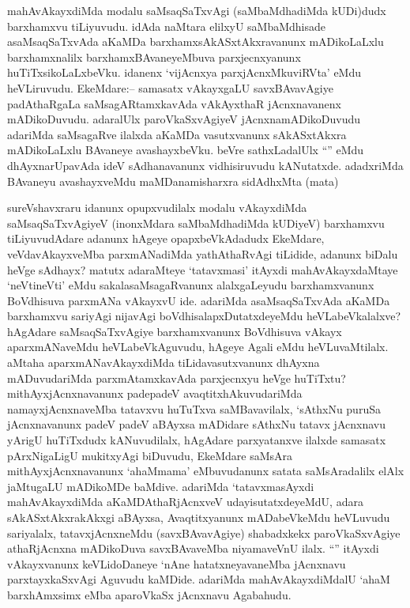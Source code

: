 \begin{artha}
mahAvAkayxdiMda modalu saMsaqSaTxvAgi (saMbaMdhadiMda kUDi)dudx barxhamxvu tiLiyuvudu. idAda naMtara elilxyU saMbaMdhisade asaMsaqSaTxvAda aKaMDa barxhamxsAkASxtAkxravanunx mADikoLaLxlu barxhamxnalilx barxhamxBAvaneyeMbuva parxjecnxyanunx huTiTxsikoLaLxbeVku. idanenx `vijAcnxya parxjAcnxMkuviRVta' eMdu heVLiruvudu. EkeMdare:-- samasatx vAkayxgaLU savxBAvavAgiye padAthaRgaLa saMsagARtamxkavAda vAkAyxthaR jAcnxnavanenx mADikoDuvudu. adaralUlx paroVkaSxvAgiyeV jAcnxnamADikoDuvudu adariMda saMsagaRve ilalxda aKaMDa vasutxvanunx sAkASxtAkxra mADikoLaLxlu BAvaneye avashayxbeVku. beVre sathxLadalUlx ``\stext'' eMdu dhAyxnarUpavAda ideV sAdhanavanunx vidhisiruvudu kANutatxde. adadxriMda BAvaneyu avashayxveMdu maMDanamisharxra sidAdhxMta (mata)
\end{artha}


\begin{artha}
  sureVshavxraru idanunx opupxvudilalx modalu vAkayxdiMda saMsaqSaTxvAgiyeV (inonxMdara saMbaMdhadiMda kUDiyeV) barxhamxvu tiLiyuvudAdare adanunx hAgeye opapxbeVkAdadudx EkeMdare, veVdavAkayxveMba parxmANadiMda yathAthaRvAgi tiLidide, adanunx biDalu heVge sAdhayx? matutx adaraMteye `tatavxmasi' itAyxdi mahAvAkayxdaMtaye `neVtineVti' eMdu sakalasaMsagaRvanunx alalxgaLeyudu barxhamxvanunx BoVdhisuva parxmANa vAkayxvU ide. adariMda asaMsaqSaTxvAda aKaMDa barxhamxvu sariyAgi nijavAgi boVdhisalapxDutatxdeyeMdu heVLabeVkalalxve? hAgAdare saMsaqSaTxvAgiye barxhamxvanunx BoVdhisuva vAkayx aparxmANaveMdu heVLabeVkAguvudu, hAgeye Agali eMdu heVLuvaMtilalx. aMtaha aparxmANavAkayxdiMda tiLidavasutxvanunx dhAyxna mADuvudariMda parxmAtamxkavAda parxjecnxyu heVge huTiTxtu? mithAyxjAcnxnavanunx padepadeV avaqtitxhAkuvudariMda namayxjAcnxnaveMba tatavxvu huTuTxva saMBavavilalx, `sAthxNu puruSa jAcnxnavanunx padeV padeV aBAyxsa mADidare sAthxNu tatavx jAcnxnavu yArigU huTiTxdudx kANuvudilalx, hAgAdare parxyatanxve ilalxde samasatx pArxNigaLigU mukitxyAgi biDuvudu, EkeMdare saMsAra mithAyxjAcnxnavanunx `ahaMmama' eMbuvudanunx satata saMsAradalilx elAlx jaMtugaLU mADikoMDe baMdive. adariMda `tatavxmasAyxdi mahAvAkayxdiMda aKaMDAthaRjAcnxveV udayisutatxdeyeMdU, adara sAkASxtAkxrakAkxgi aBAyxsa, Avaqtitxyanunx mADabeVkeMdu heVLuvudu sariyalalx, tatavxjAcnxneMdu (savxBAvavAgiye) shabadxkekx paroVkaSxvAgiye athaRjAcnxna mADikoDuva savxBAvaveMba niyamaveVnU ilalx. ``\stext'' itAyxdi vAkayxvanunx keVLidoDaneye `nAne hatatxneyavaneMba jAcnxnavu parxtayxkaSxvAgi Aguvudu kaMDide. adariMda mahAvAkayxdiMdalU `ahaM barxhAmxsimx eMba aparoVkaSx jAcnxnavu Agabahudu. 
\end{artha}

